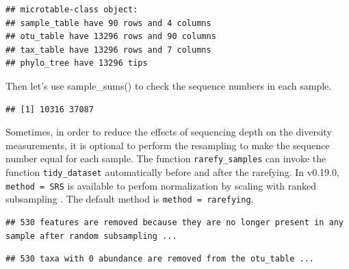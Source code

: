 \documentclass[
]{book}
\newenvironment{Shaded}{\begin{snugshade}}{\end{snugshade}}
\newcommand{\AttributeTok}[1]{\textcolor[rgb]{0.77,0.63,0.00}{#1}}
\newcommand{\CommentTok}[1]{\textcolor[rgb]{0.56,0.35,0.01}{\textit{#1}}}
\newcommand{\DecValTok}[1]{\textcolor[rgb]{0.00,0.00,0.81}{#1}}
\newcommand{\FunctionTok}[1]{\textcolor[rgb]{0.00,0.00,0.00}{#1}}
\newcommand{\NormalTok}[1]{#1}
\newcommand{\SpecialCharTok}[1]{\textcolor[rgb]{0.00,0.00,0.00}{#1}}
\begin{document}
\begin{verbatim}
## microtable-class object:
## sample_table have 90 rows and 4 columns
## otu_table have 13296 rows and 90 columns
## tax_table have 13296 rows and 7 columns
## phylo_tree have 13296 tips
\end{verbatim}

Then let's use sample\_sums() to check the sequence numbers in each sample.

\begin{Shaded}
\end{Shaded}

\begin{verbatim}
## [1] 10316 37087
\end{verbatim}

Sometimes, in order to reduce the effects of sequencing depth on the diversity measurements,
it is optional to perform the resampling to make the sequence number equal for each sample.
The function \texttt{rarefy\_samples} can invoke the function \texttt{tidy\_dataset} automatically before and after the rarefying.
In v0.19.0, \texttt{method\ =\ \textquotesingle{}SRS\textquotesingle{}} is available to perfom normalization by scaling with ranked subsampling \citep{Beule_normalization_2020}.
The default method is \texttt{method\ =\ \textquotesingle{}rarefying\textquotesingle{}}.

\begin{Shaded}
\end{Shaded}

\begin{verbatim}
## 530 features are removed because they are no longer present in any sample after random subsampling ...
\end{verbatim}

\begin{verbatim}
## 530 taxa with 0 abundance are removed from the otu_table ...
\end{verbatim}
\end{document}

